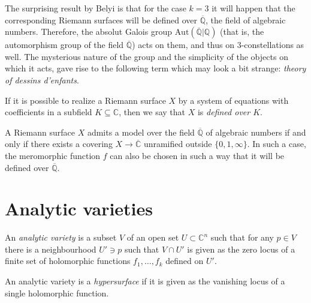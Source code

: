 The surprising result by Belyi is that for the case $k=3$ it will happen that
the corresponding Riemann surfaces will be defined over $\overline{\mathbb{Q}}$,
the field of algebraic numbers. Therefore, the absolut Galois group
$\text{Aut}(\overline{\mathbb{Q}}|\mathbb{Q})$ (that is, the automorphism group
of the field $\overline{\mathbb{Q}}$) acts on them, and thus on
$3$-constellations as well. The mysterious nature of the group and the
simplicity of the objects on which it acts, gave rise to the following term
which may look a bit strange: {\it theory of dessins d'enfants}.

\begin{definition}
\label{definition-Riemann-surface-defined-over-field}
\begin{reference}
\cite[Definition 1.8.8]{lando}
\end{reference}
If it is possible to realize a Riemann surface $X$ by a system of equations with
coefficients in a subfield $K\subseteq\mathbb{C}$, then we say that $X$ is {\it
defined over $K$}.
\end{definition}

\begin{theorem}[Belyi]
\label{theorem-Belyi}
\begin{reference}
\cite[Theorem 2.1.1]{lando}
\end{reference}
A Riemann surface $X$ admits a model over the field $\overline{ \mathbb{Q}}$ of
algebraic numbers if and only if there exists a covering $X\to \overline{
\mathbb{C}}$ unramified outside $\{0,1,\infty\}$. In such a case, the
meromorphic function $f$ can also be chosen in such a way that it will be
defined over $\overline{\mathbb{Q}}$.
\end{theorem}

\section{Analytic varieties}
\label{section-analytic-varieties}

\begin{definition}
\label{definition-analytic-variety}
An {\it analytic variety} is a subset $V$ of an open set $U\subset \mathbb{C}^n$
such that for any $p\in V$ there is a neighbourhood $U'\ni p$ such that $V\cap
U'$ is given as the zero locus of a finite set of holomorphic functions
$f_1,\ldots,f_k$ defined on $U'$.
\end{definition}

\begin{definition}
\label{definition-analytic-hypersurface}
An analytic variety is a {\it hypersurface} if it is given as the vanishing
locus of a single holomorphic function.
\end{definition}

